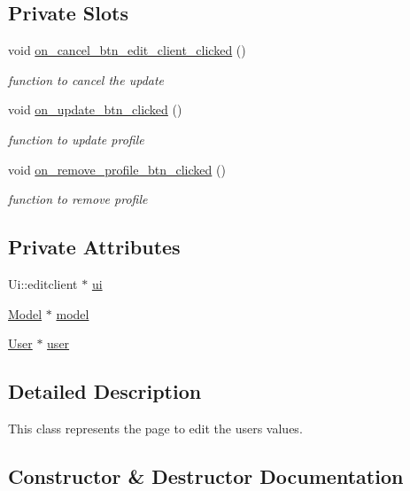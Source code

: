 \subsection*{Private Slots}
\begin{DoxyCompactItemize}
\item 
void \hyperlink{classeditclient_af544394137d9de69e4890e2ecac7fb6a}{on\+\_\+cancel\+\_\+btn\+\_\+edit\+\_\+client\+\_\+clicked} ()
\begin{DoxyCompactList}\small\item\em function to cancel the update \end{DoxyCompactList}\item 
void \hyperlink{classeditclient_ab693a42ef8626fc5c856b69b8dcf4e35}{on\+\_\+update\+\_\+btn\+\_\+clicked} ()
\begin{DoxyCompactList}\small\item\em function to update profile \end{DoxyCompactList}\item 
void \hyperlink{classeditclient_aecd65327aeb31a9bf7ba282ae3d35303}{on\+\_\+remove\+\_\+profile\+\_\+btn\+\_\+clicked} ()
\begin{DoxyCompactList}\small\item\em function to remove profile \end{DoxyCompactList}\end{DoxyCompactItemize}
\subsection*{Private Attributes}
\begin{DoxyCompactItemize}
\item 
Ui\+::editclient $\ast$ \hyperlink{classeditclient_a675352f4a557aec3af37bd4fb5dfea60}{ui}
\item 
\hyperlink{classModel}{Model} $\ast$ \hyperlink{classeditclient_aaaf4f3349486a47f6e3a1ced0d5dcd64}{model}
\item 
\hyperlink{classUser}{User} $\ast$ \hyperlink{classeditclient_a5945bbf29ac9a75c8a680f6623460899}{user}
\end{DoxyCompactItemize}


\subsection{Detailed Description}
This class represents the page to edit the user\textquotesingle{}s values. 

\subsection{Constructor \& Destructor Documentation}
\mbox{\label{classeditclient_a5ea13813becddce68bcda899fbf7bad1}} 
